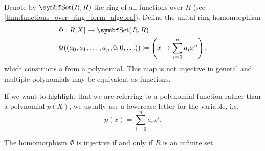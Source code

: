 \begin{definition}\label{def:polynomial_function}
  Denote by \( \Cat{Set}(R, R) \) the ring of all functions over \( R \) (see \cref{thm:functions_over_ring_form_algebra}). Define the unital ring homomorphism
  \begin{align*}
    &\Phi: R[X] \to \Cat{Set}(R, R) \\
    &\Phi((a_0, a_1, \ldots, a_n, 0, 0, \ldots)) \coloneqq \left( x \to \sum_{i=0}^n a_i x^n \right),
  \end{align*}
  which constructs a  from a polynomial. This map is not injective in general and multiple polynomials may be equivalent as functions.

  If we want to highlight that we are referring to a polynomial function rather than a polynomial \( p(X) \), we usually use a lowercase letter for the variable, i.e.
  \begin{equation*}
    p(x) = \sum_{i=0}^n a_i x^i.
  \end{equation*}

  The homomorphism \( \Phi \) is injective if and only if \( R \) is an infinite set.
\end{definition}
